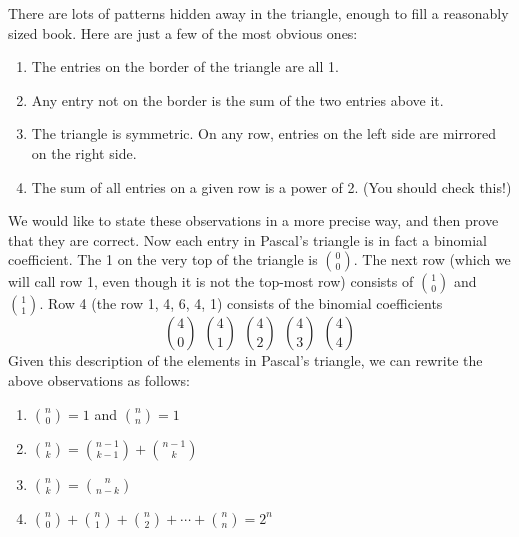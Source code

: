 \documentclass[12pt]{article}
\begin{document}
\begin{center}
\noindent{}

\end{center}

There are lots of patterns hidden away in the triangle, enough to fill a reasonably sized book.  Here are just a few of the most obvious ones:
\begin{enumerate}
  \item The entries on the border of the triangle are all 1.
  \item Any entry not on the border is the sum of the two entries above it.
  \item The triangle is symmetric.  On any row, entries on the left side are mirrored on the right side.
  \item The sum of all entries on a given row is a power of 2. (You should check this!)
\end{enumerate}

We would like to state these observations in a more precise way, and then prove that they are correct.  Now each entry in Pascal's triangle is in fact a binomial coefficient.  The 1 on the very top of the triangle is ${0 \choose 0}$.  The next row (which we will call row 1, even though it is not the top-most row) consists of ${1 \choose 0}$ and ${1 \choose 1}$.  Row 4 (the row 1, 4, 6, 4, 1) consists of the binomial coefficients
\[{4 \choose 0} ~~ {4 \choose 1} ~~ {4 \choose 2} ~~ {4 \choose 3} ~~ {4 \choose 4}\]
Given this description of the elements in Pascal's triangle, we can rewrite the above observations as follows:
\begin{enumerate}
  \item ${n \choose 0} = 1$ and ${n \choose n} = 1$
  \item ${n \choose k} = {n-1 \choose k-1} + {n-1 \choose k}$
  \item ${n \choose k} = {n \choose n-k}$
  \item ${n\choose 0} + {n \choose 1} + {n \choose 2} + \cdots + {n \choose n} = 2^n$
\end{enumerate}
\end{document}
